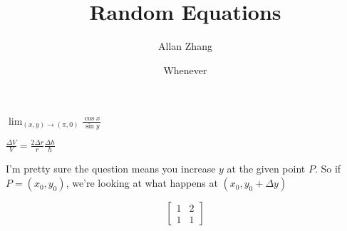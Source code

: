 \documentclass[hidelinks]{article}
\title{\textbf{Random Equations}}
\author{Allan Zhang}
\date{Whenever}
\begin{document}
\hypersetup{bookmarksnumbered=true,}
\pagecolor{white}
\color{black}
\maketitle




$\lim_{(x, y)\to(\pi, 0)}{\frac{\cos x}{\sin y}}$

$\frac{\Delta V}{V} = \frac{2 \Delta r}{r}\frac{\Delta h}{h}$

I'm pretty sure the question means you increase $y$ at the given point $P$. So if $P = (x_0, y_0)$, we're looking at what happens at $(x_0, y_0 + \Delta y)$ 


\[\begin{bmatrix} 
1 & 2 \\ 1 & 1 
\end{bmatrix}
\]
\end{document}

